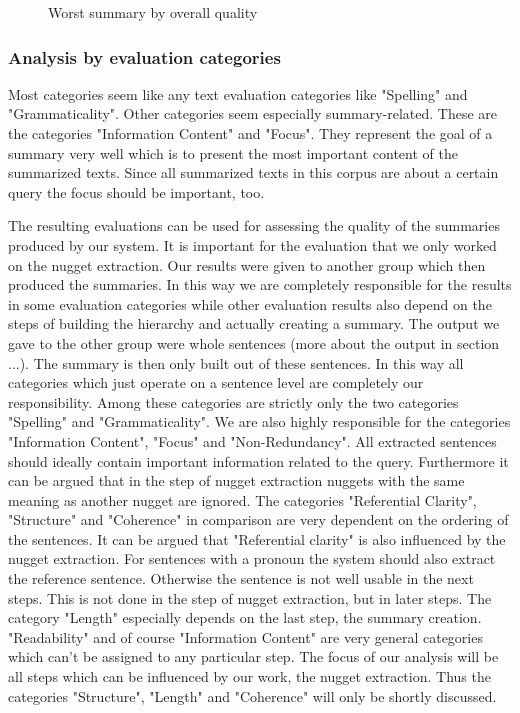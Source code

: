 \begin{figure}
	\caption{Worst summary by overall quality}
	\label{worst_summary}
	\noindent{}	
\end{figure} 


\subsubsection{Analysis by evaluation categories}
Most categories seem like any text evaluation categories like "Spelling" and "Grammaticality". Other categories seem especially summary-related. These are the categories "Information Content" and "Focus". They represent the goal of a summary very well which is to present the most important content of the summarized texts. Since all summarized texts in this corpus are about a certain query the focus should be important, too.

The resulting evaluations can be used for assessing the quality of the summaries produced by our system. It is important for the evaluation that we only worked on the nugget extraction. Our results were given to another group which then produced the summaries. In this way we are completely responsible for the results in some evaluation categories while other evaluation results also depend on the steps of  building the hierarchy and actually creating a summary. The output we gave to the other group were whole sentences (more about the output in section ...). The summary is then only built out of these sentences. In this way all categories which just operate on a sentence level are completely our responsibility. Among these categories are strictly only the two categories "Spelling" and "Grammaticality". We are also highly responsible for the categories "Information Content", "Focus" and "Non-Redundancy". All extracted sentences should ideally contain important information related to the query. Furthermore it can be argued that in the step of nugget extraction nuggets with the same meaning as another nugget are ignored. The categories "Referential Clarity", "Structure" and "Coherence" in comparison are very dependent on the ordering of the sentences. It can be argued that "Referential clarity" is also influenced by the nugget extraction. For sentences with a pronoun the system should also extract the reference sentence. Otherwise the sentence is not well usable in the next steps. This is not done in the step of nugget extraction, but in later steps. The category "Length" especially depends on the last step, the summary creation. "Readability" and of course "Information Content" are very general categories which can't be assigned to any particular step. The focus of our analysis will be all steps which can be influenced by our work, the nugget extraction. Thus the categories "Structure", "Length" and "Coherence" will only be shortly discussed.

